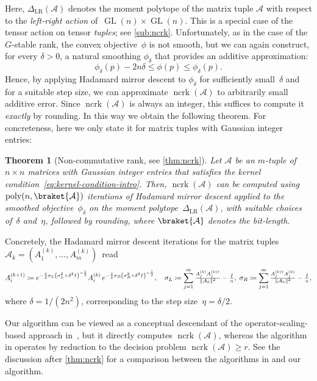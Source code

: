 \documentclass[11pt,letterpaper]{article}
\newtheorem{theorem}{Theorem}[section]
\numberwithin{equation}{section}
\DeclareMathOperator{\poly}{poly}
\DeclareMathOperator{\GL}{GL}
\DeclareMathOperator{\ncrk}{ncrk}
\DeclarePairedDelimiter\norm{\lVert}{\rVert}
\begin{document}
Here, $\Delta_{\mathrm{LR}}(\mathcal{A})$ denotes the moment polytope of the matrix tuple $\mathcal{A}$ with respect to the \emph{left-right action} of~$\GL(n)\times\GL(n)$.
This is a special case of the tensor action on tensor \emph{tuples}; see \cref{sub:ncrk}.
Unfortunately, as in the case of the $G$-stable rank, the convex objective~$\phi$ is not smooth, but we can again construct, for every $\delta>0$, a natural smoothing $\phi_\delta$ that provides an additive approximation:
\[
    \phi_\delta(p) - 2n\delta \leq \phi(p) \leq \phi_\delta(p).
\]
Hence, by applying Hadamard mirror descent to $\phi_\delta$ for sufficiently small~$\delta$ and for a suitable step size, we can approximate $\ncrk(\mathcal{A})$ to arbitrarily small additive error.
Since $\ncrk(\mathcal{A})$ is always an integer, this suffices to compute it \emph{exactly} by rounding.
In this way we obtain the following theorem.
For concreteness, here we only state it for matrix tuples with Gaussian integer entries:

\begin{theorem}[Non-commutative rank, see \cref{thm:ncrk}]
\label{thm:nc-rank-intro}
    Let $\mathcal{A}$ be an $m$-tuple of $n\times n$ matrices with Gaussian integer entries that satisfies the kernel condition~\eqref{eq:kernel-condition-intro}.
    Then, $\ncrk(\mathcal{A})$ can be computed using $\poly(n,\braket{\mathcal{A}})$ iterations of Hadamard mirror descent applied to the smoothed objective~$\phi_\delta$ on the moment polytope~$\Delta_{\mathrm{LR}}(\mathcal{A})$, with suitable choices of~$\delta$ and~$\eta$, followed by rounding, where $\braket{\mathcal A}$ denotes the bit-length.
\end{theorem}

\noindent
Concretely, the Hadamard mirror descent iterations for the matrix tuples~$\mathcal A_k = (A^{(k)}_1,\dots,A^{(k)}_m)$~read
\begin{equation*}
    A^{(k+1)}_i \coloneqq e^{-\frac{\delta}4 \sigma_L \left(\sigma_L^2 + \delta^2I\right)^{-\frac12}} A^{(k)}_i \, e^{-\frac{\delta}4\sigma_R\left(\sigma_R^2 + \delta^2I\right)^{-\frac12}},
    \quad
    \sigma_L \coloneqq \sum_{j=1}^{m} \tfrac {A_j^{(k)} A_j^{(k)\dagger}} {\norm{\mathcal A_k}^2} - \tfrac I n, \;
    \sigma_R \coloneqq \sum_{j=1}^{m} \tfrac {A_j^{(k)\dagger} A_j^{(k)}} {\norm{\mathcal A_k}^2} - \tfrac I n,
\end{equation*}
where $\delta=1/(2n^2)$, corresponding to the step size~$\eta=\delta/2$.

Our algorithm can be viewed as a conceptual descendant of the operator-scaling-based approach in~\cite{GGOW20}, but it directly computes $\ncrk(\mathcal{A})$, whereas the algorithm in \cite{GGOW20} operates by reduction to the decision problem $\ncrk(\mathcal{A})\geq r$.
See the discussion after \cref{thm:ncrk} for a comparison between the algorithms in \cite{IQS-18,Hamada-Hirai-21} and our algorithm.
\end{document}
